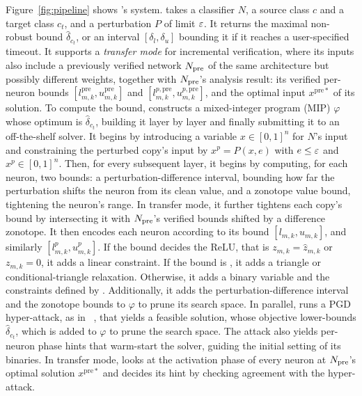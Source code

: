 Figure~\ref{fig:pipeline} shows \tool's system. \tool takes a classifier $N$, a
source class $c$ and a target class $c_t$, and a perturbation $P$ of limit $\varepsilon$. It returns the maximal
non-robust bound $\hat\delta_{c_t}$, or an interval $[\delta_l,\delta_u]$ bounding it if it reaches a
user-specified timeout. It supports a \emph{transfer mode} for incremental verification, where its
inputs also include a previously verified network $N_{\mathrm{pre}}$ of the same architecture but possibly
different weights, together with $N_{\mathrm{pre}}$'s analysis result: its verified per-neuron bounds
$[l^{\mathrm{pre}}_{m,k},u^{\mathrm{pre}}_{m,k}]$ and $[l^{p,\mathrm{pre}}_{m,k},u^{p,\mathrm{pre}}_{m,k}]$,
and the optimal input $x^{\mathrm{pre}*}$ of its solution. To compute the bound, \tool constructs a mixed-integer program (MIP) $\varphi$ whose
optimum is $\hat\delta_{c_t}$, building it layer by layer and finally submitting it to an off-the-shelf
solver. It begins by introducing a variable $x\in[0,1]^n$ for $N$'s input and
constraining the perturbed copy's input by $x^{p}=P(x,e)$ with $e\le\varepsilon$ and $x^{p}\in[0,1]^n$. Then, for
every subsequent layer, it begins by computing, for each neuron, two bounds: a perturbation-difference
interval, bounding how far the perturbation shifts the neuron from its clean value, and a zonotope value
bound, tightening the neuron's range. In transfer mode, it further tightens each copy's bound by
intersecting it with $N_{\mathrm{pre}}$'s verified bounds shifted by a difference zonotope. It then encodes each
neuron according to its bound
$[l_{m,k},u_{m,k}]$, and similarly $[l^{p}_{m,k},u^{p}_{m,k}]$. If the bound decides the ReLU, that is
$z_{m,k}=\hat z_{m,k}$ or $z_{m,k}=0$, it adds a linear constraint. If the bound is , it adds
a triangle or conditional-triangle relaxation. Otherwise, it adds a binary variable and the constraints
defined by \citet{tjeng2019}. Additionally, it adds the perturbation-difference interval and the zonotope bounds
to $\varphi$ to prune its search space. In parallel, \tool runs a PGD hyper-attack, as in \baseline~\cite{kabaha2024vhagar}, that yields a
feasible solution, whose objective lower-bounds $\hat\delta_{c_t}$, which is added to $\varphi$ to prune
the search space. The attack also yields per-neuron phase hints that warm-start the solver, guiding the initial setting of
its binaries. In transfer mode, \tool looks at the activation phase of every neuron at $N_{\mathrm{pre}}$'s optimal solution $x^{\mathrm{pre}*}$ and decides its hint by checking agreement with the hyper-attack.

